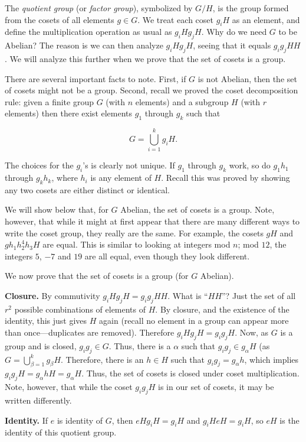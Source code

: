 \documentclass[12pt,letterpaper]{report}
\newcommand\be{\begin{equation}}
\newcommand\ee{\end{equation}}
\begin{document}
The {\em quotient group} (or {\em factor group}), symbolized by
$G/H$, is the group formed from the cosets of all elements $g\in
G$. We treat each coset $g_i H$ as an element, and define the
multiplication operation as usual as $g_i H g_j H$. Why do we need
$G$ to be Abelian? The reason is we can then analyze $g_i H g_j
H$, seeing that it equals $g_i g_j H H$. We will analyze this
further when we prove that the set of cosets is a group.

There are several important facts to note. First, if $G$ is not
Abelian, then the set of cosets might not be a group. Second,
recall we proved the coset decomposition rule: given a finite
group $G$ (with $n$ elements) and a subgroup $H$ (with $r$
elements) then there exist elements $g_1$ through $g_k$ such that

\be G = \bigcup_{i=1}^k g_i H. \ee

The choices for the $g_i$'s is clearly not unique. If $g_1$
through $g_k$ work, so do $g_1 h_1$ through $g_k h_k$, where $h_i$
is any element of $H$. Recall this was proved by showing any two
cosets are either distinct or identical.

We will show below that, for $G$ Abelian, the set of cosets is a
group. Note, however, that while it might at first appear that
there are many different ways to write the coset group, they
really are the same. For example, the cosets $gH$ and $g h_1 h_2^4
h_3 H$ are equal. This is similar to looking at integers mod $n$;
mod $12$, the integers $5$, $-7$ and $19$ are all equal, even
though they look different.

We now prove that the set of cosets is a group (for $G$ Abelian).


{\bf Closure.} By commutivity $g_i H g_j H = g_i g_j H H$. What is
``$H H$''? Just the set of all $r^2$ possible combinations of
elements of $H$. By closure, and the existence of the identity,
this just gives $H$ again (recall no element in a group can appear
more than once---duplicates are removed). Therefore $g_i H g_j H =
g_i g_j H$. Now, as $G$ is a group and is closed, $g_i g_j \in G$.
Thus, there is a $\alpha$ such that $g_i g_j \in g_\alpha H$ (as
$G = \bigcup_{\beta=1}^k g_\beta H$. Therefore, there is an $h \in
H$ such that $g_i g_j = g_\alpha h$, which implies $g_i g_j H =
g_\alpha h H = g_\alpha H$. Thus, the set of cosets is closed
under coset multiplication. Note, however, that while the coset
$g_i g_j H$ is in our set of cosets, it may be written
differently.

{\bf Identity.} If $e$ is identity of $G$, then $eH g_i H = g_i H$
and $g_i H eH = g_i H$, so $eH$ is the identity of this quotient
group.
\end{document}
